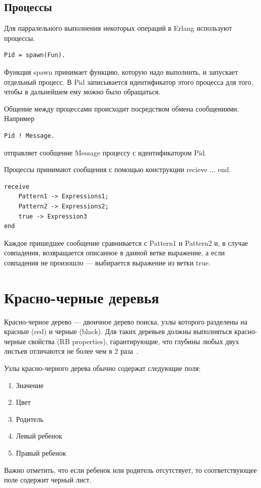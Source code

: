 		\subsection{Процессы}
			Для парралельного выполнения некоторых операций в Erlang используют процессы.
			\begin{lstlisting}
Pid = spawn(Fun).
			\end{lstlisting}
			Функция spawn принимает функцию, которую надо выполнить, и запускает отдельный процесс. В Pid записывается идентификатор
			этого процесса для того, чтобы в дальнейшем ему можно было обращаться.
			
			Общение между процессами происходит посредством обмена сообщениями. Например
			\begin{lstlisting}
Pid ! Message.
			\end{lstlisting}
			отправляет сообщение Message процессу с идентификатором Pid.

			Процессы принимают сообщения с помощью конструкции recieve ... end. 
			\begin{lstlisting}
receive
	Pattern1 -> Expressions1;
	Pattern2 -> Expressions2;
	true -> Expression3
end
			\end{lstlisting}
			Каждое пришедшее сообщение сравнивается с Pattern1 и Pattern2 и, в случае совпадения, возвращается описанное в данной 
			ветке выражение, а если совпадения не произошло --- выбирается выражение из ветки true. 
	

	\section{Красно-черные деревья}
		Красно-черное дерево --- двоичное дерево поиска, узлы которого 
		разделены на красные (red) и черные (black). Для таких деревьев
		должны выполняться красно-черные свойства (RB properties), 
		гарантирующие, что глубины любых двух листьев отличаются не более
		чем в 2 раза~\cite{kormen}.

		Узлы красно-черного дерева обычно содержат следующие поля:
		\begin{enumerate}
			\item Значение
			\item Цвет
			\item Родитель
			\item Левый ребенок
			\item Правый ребенок
		\end{enumerate}	

		Важно отметить, что если ребенок или родитель отсутствует, то
		соответствующее поле содержит черный лист.
		
